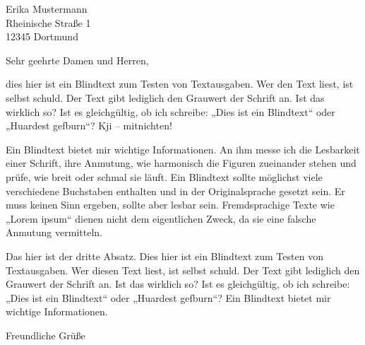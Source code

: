 \documentclass[version=last, scilifelabletter]{scrlttr2}
\begin{document}
%
\begin{letter}{%
		Erika Mustermann\\
		Rheinische Straße 1\\
		12345 Dortmund%
	}
	\opening{Sehr geehrte Damen und Herren,}
	dies hier ist ein Blindtext zum Testen von Textausgaben. Wer den Text liest,
	ist selbst schuld. Der Text gibt lediglich den Grauwert der Schrift an. Ist das
	wirklich so? Ist es gleichgültig, ob ich schreibe: „Dies ist ein Blindtext“ oder
	„Huardest gefburn“? Kji – mitnichten!
	
	Ein Blindtext bietet mir wichtige Informationen.
	An ihm messe ich die Lesbarkeit einer Schrift, ihre Anmutung, wie
	harmonisch die Figuren zueinander stehen und prüfe, wie breit oder schmal
	sie läuft. Ein Blindtext sollte möglichst viele verschiedene Buchstaben enthalten
	und in der Originalsprache gesetzt sein. Er muss keinen Sinn ergeben,
	sollte aber lesbar sein. Fremdsprachige Texte wie „Lorem ipsum“ dienen nicht
	dem eigentlichen Zweck, da sie eine falsche Anmutung vermitteln.
	
	Das hier ist der dritte Absatz. Dies hier ist ein Blindtext zum Testen von Textausgaben.
	Wer diesen Text liest, ist selbst schuld. Der Text gibt lediglich den
	Grauwert der Schrift an. Ist das wirklich so? Ist es gleichgültig, ob ich schreibe:
	„Dies ist ein Blindtext“ oder „Huardest gefburn“? 
	Ein Blindtext bietet mir wichtige Informationen.
	\closing{Freundliche Grüße}
\end{letter}
%
\end{document}
